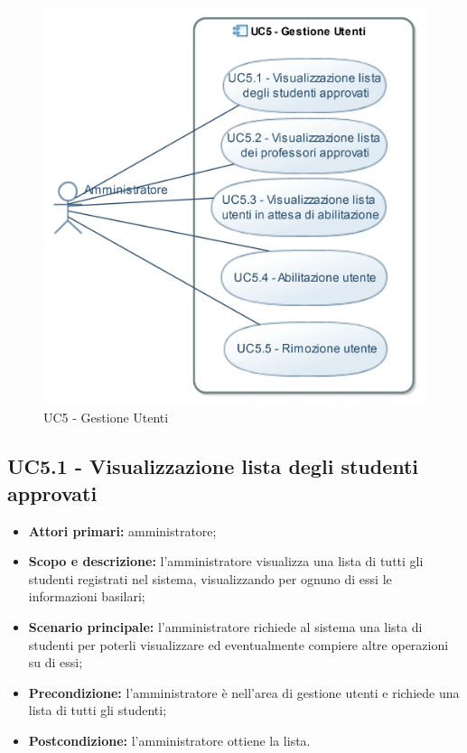 \documentclass[AnalisiDeiRequisiti.tex]{subfiles}
\begin{document}
\begin{figure}[H]
	\centering
	\includegraphics[width=0.8\linewidth]{UC5.jpg}
	\caption{UC5 - Gestione Utenti}
	\label{fig:UC5 - Gestione Utenti}
\end{figure}

\subsection{UC5.1 - Visualizzazione lista degli studenti approvati}
\begin{itemize}
	\item \textbf{Attori primari:} amministratore;
	\item \textbf{Scopo e descrizione:} l'amministratore visualizza una lista di tutti gli studenti registrati nel sistema, visualizzando per ognuno di essi le informazioni basilari;
	\item \textbf{Scenario principale:} l'amministratore richiede al sistema una lista di studenti per poterli visualizzare ed eventualmente compiere altre operazioni su di essi;
	\item \textbf{Precondizione:} l'amministratore è nell'area di gestione utenti e richiede una lista di tutti gli studenti; 
	\item \textbf{Postcondizione:} l'amministratore ottiene la lista.
\end{itemize}
\end{document}
